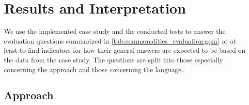 


\section{Results and Interpretation}

We use the implemented case study and the conducted tests to answer the evaluation questions summarized in \autoref{tab:commonalities_evaluation:gqm} or at least to find indicators for how their general answers are expected to be based on the data from the case study.
The questions are split into those especially concerning the \commonalities approach and those concerning the \commonalities language.

\subsection*{\Commonalities Approach}

